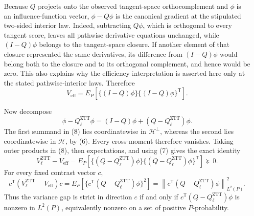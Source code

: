 Because \(Q\) projects onto the observed tangent-space orthocomplement and \(\phi\) is an influence-function vector, \(\phi-Q\phi\) is the canonical gradient at the stipulated two-sided interior law.  Indeed, subtracting \(Q\phi\), which is orthogonal to every tangent score, leaves all pathwise derivative equations unchanged, while \((I-Q)\phi\) belongs to the tangent-space closure.  If another element of that closure represented the same derivatives, its difference from \((I-Q)\phi\) would belong both to the closure and to its orthogonal complement, and hence would be zero.  This also explains why the efficiency interpretation is asserted here only at the stated pathwise-interior laws.  Therefore
\[
V_{\mathrm{eff}}=E_P\!\left[\{(I-Q)\phi\}\{(I-Q)\phi\}^{\mathsf T}\right].               \tag{7}
\]

Now decompose
\[
\phi-Q_\ell^{\mathrm{ZTT}}\phi
=(I-Q)\phi+(Q-Q_\ell^{\mathrm{ZTT}})\phi.                                                   \tag{8}
\]
The first summand in (8) lies coordinatewise in \(\mathcal H^\perp\), whereas the second lies coordinatewise in \(\mathcal H\), by (6).  Every cross-moment therefore vanishes.  Taking outer products in (8), then expectations, and using (7) gives the exact identity
\[
V_\ell^{\mathrm{ZTT}}-V_{\mathrm{eff}}
=E_P\!\left[\{(Q-Q_\ell^{\mathrm{ZTT}})\phi\}
             \{(Q-Q_\ell^{\mathrm{ZTT}})\phi\}^{\mathsf T}\right]\succeq0.              \tag{9}
\]
For every fixed contrast vector \(c\),
\[
c^{\mathsf T}(V_\ell^{\mathrm{ZTT}}-V_{\mathrm{eff}})c
=E_P\!\left[\{c^{\mathsf T}(Q-Q_\ell^{\mathrm{ZTT}})\phi\}^2\right]
=\left\|c^{\mathsf T}(Q-Q_\ell^{\mathrm{ZTT}})\phi\right\|_{L^2(P)}^2.                  \tag{10}
\]
Thus the variance gap is strict in direction \(c\) if and only if \(c^{\mathsf T}(Q-Q_\ell^{\mathrm{ZTT}})\phi\) is nonzero in \(L^2(P)\), equivalently nonzero on a set of positive \(P\)-probability.

